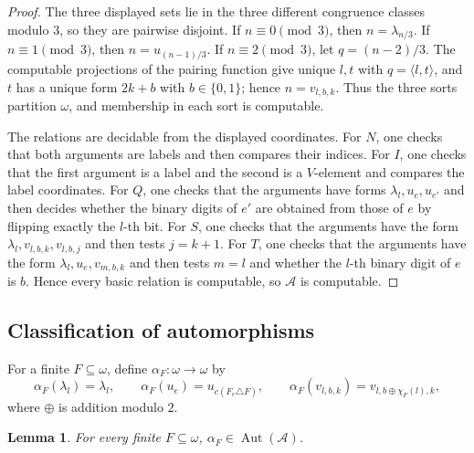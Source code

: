 \documentclass[12pt]{article}
\newtheorem{lemma}[theorem]{Lemma}
\theoremstyle{definition}
\theoremstyle{remark}
\newcommand{\Aut}{\operatorname{Aut}}
\begin{document}
\begin{proof}
The three displayed sets lie in the three different congruence classes modulo \(3\), so they are pairwise disjoint.  If \(n\equiv 0\pmod 3\), then \(n=\lambda_{n/3}\).  If \(n\equiv 1\pmod 3\), then \(n=u_{(n-1)/3}\).  If \(n\equiv 2\pmod 3\), let \(q=(n-2)/3\).  The computable projections of the pairing function give unique \(l,t\) with \(q=\langle l,t\rangle\), and \(t\) has a unique form \(2k+b\) with \(b\in\{0,1\}\); hence \(n=v_{l,b,k}\).  Thus the three sorts partition \(\omega\), and membership in each sort is computable.

The relations are decidable from the displayed coordinates.  For \(N\), one checks that both arguments are labels and then compares their indices.  For \(I\), one checks that the first argument is a label and the second is a \(V\)-element and compares the label coordinates.  For \(Q\), one checks that the arguments have forms \(\lambda_l,u_e,u_{e'}\) and then decides whether the binary digits of \(e'\) are obtained from those of \(e\) by flipping exactly the \(l\)-th bit.  For \(S\), one checks that the arguments have the form \(\lambda_l,v_{l,b,k},v_{l,b,j}\) and then tests \(j=k+1\).  For \(T\), one checks that the arguments have the form \(\lambda_l,u_e,v_{m,b,k}\) and then tests \(m=l\) and whether the \(l\)-th binary digit of \(e\) is \(b\).  Hence every basic relation is computable, so \(\mathcal A\) is computable.
\end{proof}

\subsection{Classification of automorphisms}\label{sec:automorphisms}

For a finite \(F\subseteq\omega\), define \(\alpha_F:\omega\to\omega\) by
\[
\alpha_F(\lambda_l)=\lambda_l,\qquad
\alpha_F(u_e)=u_{c(F_e\triangle F)},\qquad
\alpha_F(v_{l,b,k})=v_{l,b\oplus\chi_F(l),k},
\]
where \(\oplus\) is addition modulo \(2\).

\begin{lemma}\label{lem:alpha-auto}
For every finite \(F\subseteq\omega\), \(\alpha_F\in\Aut(\mathcal A)\).
\end{lemma}
\end{document}
